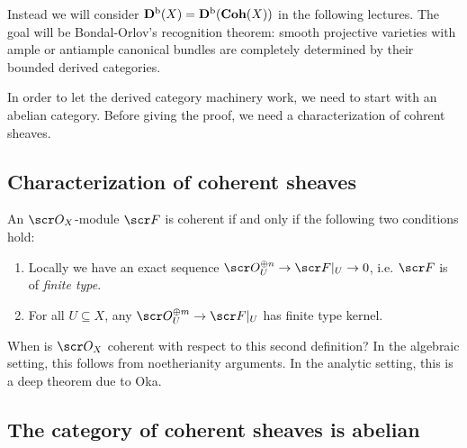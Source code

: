 \documentclass[A4paper, british, reqno]{amsart}
\theoremstyle{darkgreentheorem}
\theoremstyle{darkbluedefinition}
\theoremstyle{darkredexample}
\theoremstyle{remark}
\newcommand{\1}{\mathbbm{1}}
\newcommand{\op}{\oplus}
\newcommand{\sub}{\subseteq}
\begin{document}
Instead we will consider $\mathbf{D}^{\mathrm{b}}(X)=\mathbf{D}^{\mathrm{b}}(\mathbf{Coh}(X))$ in the following lectures.
The goal will be Bondal-Orlov's recognition theorem: smooth projective varieties with ample or antiample canonical bundles are completely determined by their bounded derived categories.

In order to let the derived category machinery work, we need to start with an abelian category.
Before giving the proof, we need a characterization of cohrent sheaves.

\subsection{Characterization of coherent sheaves}

An $\O_{X}$-module $\F$ is coherent if and only if the following two conditions hold:
\begin{enumerate}
    \item Locally we have an exact sequence $\O_{U}^{\op n}\to \F|_{U}\to 0$, i.e. $\F$ is of \textit{finite type}.
    \item For all $U\sub X$, any $\O_{U}^{\op m}\to \F|_{U}$ has finite type kernel.
\end{enumerate}

When is $\O_{X}$ coherent with respect to this second definition?
In the algebraic setting, this follows from noetherianity arguments.
In the analytic setting, this is a deep theorem due to Oka.
	    
\subsection{The category of coherent sheaves is abelian}
\end{document}
